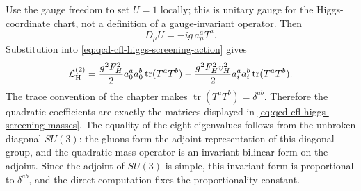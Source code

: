 Use the gauge freedom to set \(U=1\) locally; this is unitary gauge for the
Higgs-coordinate chart, not a definition of a gauge-invariant operator.
Then
\[
  D_\mu U=-i g\,a_\mu^aT^a .
\]
Substitution into \eqref{eq:qcd-cfl-higgs-screening-action} gives
\[
  \mathcal L_{\rm H}^{(2)}
  =
  \frac{g^2F_H^2}{2}
  a_0^aa_0^b\operatorname{tr}(T^aT^b)
  -
  \frac{g^2F_H^2v_H^2}{2}
  a_i^aa_i^b\operatorname{tr}(T^aT^b).
\]
The trace convention of the chapter makes
\(\operatorname{tr}(T^aT^b)=\delta^{ab}\).  Therefore the quadratic
coefficients are exactly the matrices displayed in
\eqref{eq:qcd-cfl-higgs-screening-masses}.  The equality of the eight
eigenvalues follows from the unbroken diagonal \(SU(3)\): the gluons form
the adjoint representation of this diagonal group, and the quadratic mass
operator is an invariant bilinear form on the adjoint.  Since the adjoint of
\(SU(3)\) is simple, this invariant form is proportional to
\(\delta^{ab}\), and the direct computation fixes the proportionality
constant.

